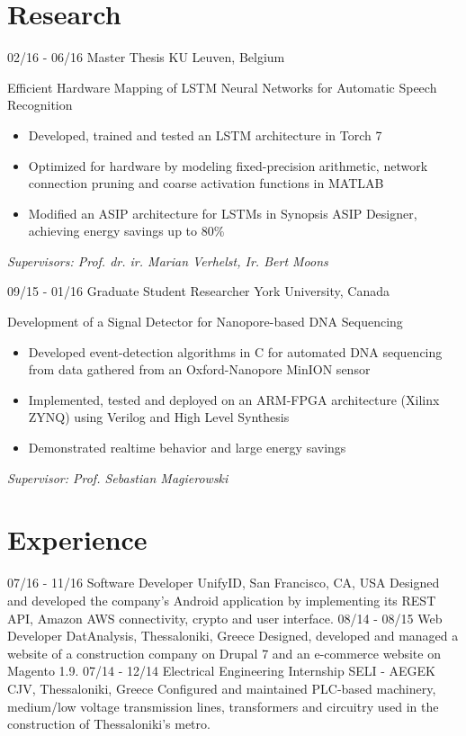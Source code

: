 \documentclass[]{friggeri-cv}
\begin{document}
\section{Research}
\vspace{-\parsep}
\begin{entrylist}
	\entry
	{02/16 - 06/16}
	{Master Thesis}
	{KU Leuven, Belgium}
	{Efficient Hardware Mapping of LSTM Neural Networks for Automatic Speech Recognition\vspace{0.5\baselineskip}
	\begin{itemize}
		\item Developed, trained and tested an LSTM architecture in Torch 7
		\item Optimized for hardware by modeling fixed-precision arithmetic, network connection pruning and coarse activation functions in MATLAB 
		\item Modified an ASIP architecture for LSTMs in Synopsis ASIP Designer, achieving energy savings up to 80\%
\end{itemize}
\emph{Supervisors: Prof. dr. ir. Marian Verhelst, Ir. Bert Moons}}

\entry
{09/15 - 01/16}
{Graduate Student Researcher}
{York University, Canada}
{Development of a Signal Detector for Nanopore-based DNA Sequencing\vspace{0.5\baselineskip}
	\begin{itemize}
		\item Developed event-detection algorithms in C for automated DNA sequencing from data gathered from an Oxford-Nanopore MinION sensor
		\item Implemented, tested and deployed on an ARM-FPGA architecture (Xilinx ZYNQ) using Verilog and High Level Synthesis
		\item Demonstrated realtime behavior and large energy savings
\end{itemize}
\emph{Supervisor: Prof. Sebastian Magierowski}}
\end{entrylist}

\vspace{-\parsep}
\section{Experience}
\vspace{-\parsep}
\begin{entrylist}
    \entry
    {07/16 - 11/16}
    {Software Developer}
    {UnifyID, San Francisco, CA, USA}
    {Designed and developed the company's Android application by implementing its REST API, Amazon AWS connectivity, crypto and user interface.}
    \entry
    {08/14 - 08/15}
    {Web Developer}
    {DatAnalysis, Thessaloniki, Greece}
    {Designed, developed and managed a website of a construction company on Drupal 7 and an e-commerce website on Magento 1.9.}
    \entry
    {07/14 - 12/14}
    {Electrical Engineering Internship}
    {SELI - AEGEK CJV, Thessaloniki, Greece}
    {Configured and maintained PLC-based machinery, medium/low voltage transmission lines, transformers and circuitry used in the construction of Thessaloniki's metro.}
\end{entrylist}
\vspace{-\parsep}
\end{document}
